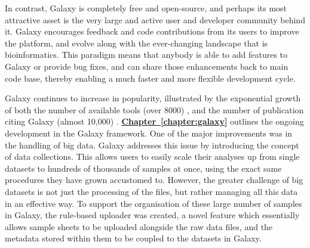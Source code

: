 In contrast, Galaxy is completely free and open-source, and perhaps its most attractive asset is the very large and active user and developer community behind it. Galaxy encourages feedback and code contributions from its users to improve the platform, and evolve along with the ever-changing landscape that is bioinformatics. This paradigm means that anybody is able to add features to Galaxy or provide bug fixes, and can share those enhancements back to main code base, thereby enabling a much faster and more flexible development cycle.

Galaxy continues to increase in popularity, illustrated by the exponential growth of both the number of available tools (over 8000) \cite{galaxytoolshed}, and the number of publication citing Galaxy (almost 10,000) \cite{url-zotero-galaxy}.
\hyperref[chapter:galaxy]{\textbf{Chapter~\ref{chapter:galaxy}}} outlines the ongoing development in the Galaxy framework. One of the major improvements was in the handling of big data. Galaxy addresses this issue by introducing the concept of data collections. This allows users to easily scale their analyses up from single datasets to hundreds of thousands of samples at once, using the exact same procedures they have grown accustomed to.
However, the greater challenge of big datasets is not just the processing of the files, but rather managing all this data in an effective way.
To support the organisation of these large number of samples in Galaxy, the rule-based uploader was created, a novel feature which essentially allows sample sheets to be uploaded alongside the raw data files, and the metadata stored within them to be coupled to the datasets in Galaxy.


